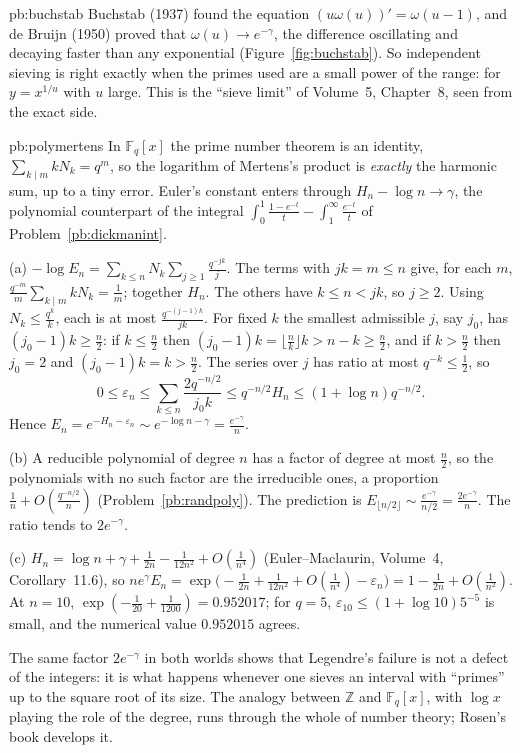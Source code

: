 \begin{solution}{pb:buchstab}
\leads Buchstab (1937) found the equation $(u\omega(u))'=\omega(u-1)$, and de Bruijn (1950) proved that $\omega(u)\to e^{-\gamma}$, the difference oscillating and decaying faster than any exponential
(Figure~\ref{fig:buchstab}). So independent sieving is right exactly when the primes used are a small power of the range: for $y=x^{1/u}$ with $u$ large. This is the ``sieve limit'' of Volume~5,
Chapter~8, seen from the exact side.
\end{solution}

\begin{solution}{pb:polymertens}
\idea In $\mathbb F_q[x]$ the prime number theorem is an identity, $\sum_{k\mid m}kN_k=q^m$, so the logarithm of Mertens's product is \emph{exactly} the harmonic sum, up to a tiny
error. Euler's constant enters through $H_n-\log n\to\gamma$, the polynomial counterpart of the integral $\int_0^1\frac{1-e^{-t}}t-\int_1^\infty\frac{e^{-t}}t$ of Problem~\ref{pb:dickmanint}.

\writeup (a) $-\log E_n=\sum_{k\le n}N_k\sum_{j\ge1}\frac{q^{-jk}}j$. The terms with $jk=m\le n$ give, for each $m$, $\frac{q^{-m}}m\sum_{k\mid m}kN_k=\frac1m$; together $H_n$.
The others have $k\le n<jk$, so $j\ge2$. Using $N_k\le\frac{q^k}k$, each is at most $\frac{q^{-(j-1)k}}{jk}$. For fixed $k$ the smallest admissible $j$, say $j_0$, has $(j_0-1)k\ge\frac n2$:
if $k\le\frac n2$ then $(j_0-1)k=\lfloor\frac nk\rfloor k>n-k\ge\frac n2$, and if $k>\frac n2$ then $j_0=2$ and $(j_0-1)k=k>\frac n2$. The series over $j$ has ratio at most $q^{-k}\le\frac12$, so
\[
0\le\varepsilon_n\le\sum_{k\le n}\frac{2q^{-n/2}}{j_0k}\le q^{-n/2}H_n\le(1+\log n)q^{-n/2}.
\]
Hence $E_n=e^{-H_n-\varepsilon_n}\sim e^{-\log n-\gamma}=\frac{e^{-\gamma}}n$.

(b) A reducible polynomial of degree $n$ has a factor of degree at most $\frac n2$, so the polynomials with no such factor are the irreducible ones, a proportion $\frac1n+O(\frac{q^{-n/2}}n)$
(Problem~\ref{pb:randpoly}). The prediction is $E_{\lfloor n/2\rfloor}\sim\frac{e^{-\gamma}}{n/2}=\frac{2e^{-\gamma}}n$. The ratio tends to $2e^{-\gamma}$.

(c) $H_n=\log n+\gamma+\frac1{2n}-\frac1{12n^2}+O(\frac1{n^4})$ (Euler--Maclaurin, Volume~4, Corollary~11.6), so $ne^\gamma E_n=\exp\bigl(-\frac1{2n}+\frac1{12n^2}+O(\frac1{n^4})-\varepsilon_n\bigr)=1-\frac1{2n}+O(\frac1{n^2})$.
At $n=10$, $\exp(-\frac1{20}+\frac1{1200})=0.952017$; for $q=5$, $\varepsilon_{10}\le(1+\log10)5^{-5}$ is small, and the numerical value $0.952015$ agrees.

\leads The same factor $2e^{-\gamma}$ in both worlds shows that Legendre's failure is not a defect of the integers: it is what happens whenever one sieves an interval with ``primes'' up to the
square root of its size. The analogy between $\mathbb Z$ and $\mathbb F_q[x]$, with $\log x$ playing the role of the degree, runs through the whole of number theory; Rosen's book develops it.
\end{solution}

